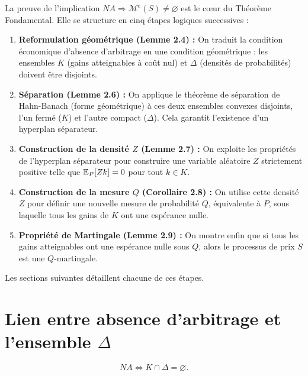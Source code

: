 \begin{tcolorbox}[title=Stratégie de la Preuve du FTAP (Sens $\Rightarrow$), colback=orange!5!white, colframe=orange!50!black]
La preuve de l'implication $NA \Rightarrow \mathcal{M}^e(S) \neq \varnothing$ est le cœur du Théorème Fondamental. Elle se structure en cinq étapes logiques successives :

\begin{enumerate}
    \item \textbf{Reformulation géométrique (Lemme 2.4) :} On traduit la condition économique d'absence d'arbitrage en une condition géométrique : les ensembles $K$ (gains atteignables à coût nul) et $\Delta$ (densités de probabilités) doivent être disjoints.
    \item \textbf{Séparation (Lemme 2.6) :} On applique le théorème de séparation de Hahn-Banach (forme géométrique) à ces deux ensembles convexes disjoints, l'un fermé ($K$) et l'autre compact ($\Delta$). Cela garantit l'existence d'un hyperplan séparateur.
    \item \textbf{Construction de la densité $Z$ (Lemme 2.7) :} On exploite les propriétés de l'hyperplan séparateur pour construire une variable aléatoire $Z$ strictement positive telle que $\mathbb{E}_P[Zk] = 0$ pour tout $k \in K$.
    \item \textbf{Construction de la mesure $Q$ (Corollaire 2.8) :} On utilise cette densité $Z$ pour définir une nouvelle mesure de probabilité $Q$, équivalente à $P$, sous laquelle tous les gains de $K$ ont une espérance nulle.
    \item \textbf{Propriété de Martingale (Lemme 2.9) :} On montre enfin que si tous les gains atteignables ont une espérance nulle sous $Q$, alors le processus de prix $S$ est une $Q$-martingale.
\end{enumerate}
\end{tcolorbox}

Les sections suivantes détaillent chacune de ces étapes.

\section{Lien entre absence d'arbitrage et l'ensemble $\Delta$}

\begin{lemme}
\begin{equation}
NA \Longleftrightarrow K \cap \Delta = \varnothing.
\end{equation}
\end{lemme}

